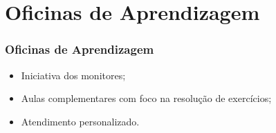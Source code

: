 \section{Oficinas de Aprendizagem}
	\begin{frame}
		\frametitle{Oficinas de Aprendizagem}
			\begin{itemize}[<+- | alert@+>]
				\item Iniciativa dos monitores;
				\item Aulas complementares com foco na resolução de exercícios;
				\item Atendimento personalizado.
			\end{itemize}
	\end{frame}